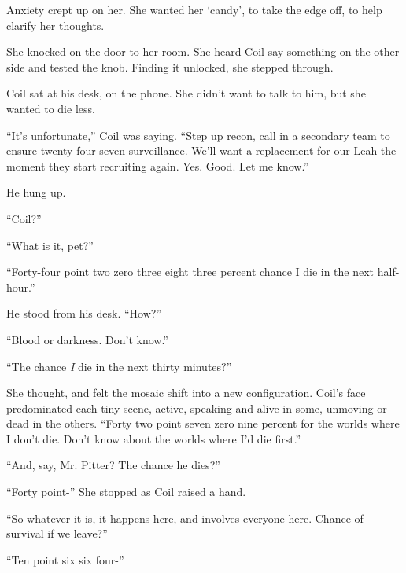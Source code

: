 Anxiety crept up on her.  She wanted her `candy', to take the edge off, to help clarify her thoughts.



She knocked on the door to her room.  She heard Coil say something on the other side and tested the knob.  Finding it unlocked, she stepped through.



Coil sat at his desk, on the phone.  She didn't want to talk to him, but she wanted to die less.



``It's unfortunate,'' Coil was saying.  ``Step up recon, call in a secondary team to ensure twenty-four seven surveillance.  We'll want a replacement for our Leah the moment they start recruiting again.  Yes.  Good.  Let me know.''



He hung up.



``Coil?''



``What is it, pet?''



``Forty-four point two zero three eight three percent chance I die in the next half-hour.''



He stood from his desk.  ``How?''



``Blood or darkness.  Don't know.''



``The chance \emph{I} die in the next thirty minutes?''



She thought, and felt the mosaic shift into a new configuration.  Coil's face predominated each tiny scene, active, speaking and alive in some, unmoving or dead in the others. ``Forty two point seven zero nine percent for the worlds where I don't die.  Don't know about the worlds where I'd die first.''



``And, say, Mr. Pitter?  The chance he dies?''



``Forty point-''  She stopped as Coil raised a hand.



``So whatever it is, it happens here, and involves everyone here.  Chance of survival if we leave?''



``Ten point six six four-''



